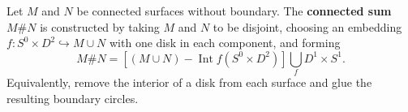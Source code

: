 Let $M$ and $N$ be connected surfaces without boundary. The \textbf{connected sum} $M \# N$ is constructed by taking $M$ and $N$ to be disjoint, choosing an embedding $f: S^0 \times D^2 \hookrightarrow M \cup N$ with one disk in each component, and forming
$$
M \# N = \left[(M \cup N) - \operatorname{Int} f(S^0 \times D^2)\right] \bigcup_f D^1 \times S^1.
$$
Equivalently, remove the interior of a disk from each surface and glue the resulting boundary circles.
